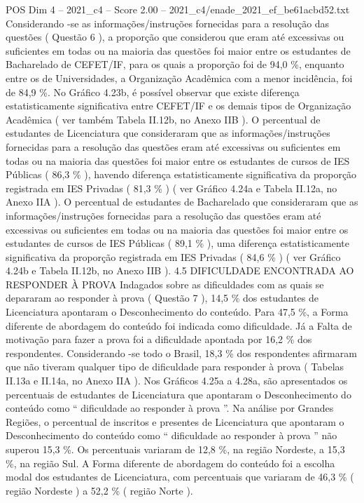 \begin{textsample}{POS Dim 4 – 2021\_c4 – Score 2.00 – 2021\_c4/enade\_2021\_ef\_be61acbd52.txt}
Considerando -se as informações/instruções fornecidas para a resolução das questões ( Questão 6 ), a proporção que considerou que eram até excessivas ou suficientes em todas ou na maioria das questões foi maior entre os estudantes de Bacharelado de CEFET/IF, para os quais a proporção foi de 94,0 \%, enquanto entre os de Universidades, a Organização Acadêmica com a menor incidência, foi de 84,9 \%.
No Gráfico 4.23b, é possível observar que existe diferença estatisticamente significativa entre CEFET/IF e os demais tipos de Organização Acadêmica ( ver também Tabela II.12b, no Anexo IIB ).
O percentual de estudantes de Licenciatura que consideraram que as informações/instruções fornecidas para a resolução das questões eram até excessivas ou suficientes em todas ou na maioria das questões foi maior entre os estudantes de cursos de IES Públicas ( 86,3 \% ), havendo diferença estatisticamente significativa da proporção registrada em IES Privadas ( 81,3 \% ) ( ver Gráfico 4.24a e Tabela II.12a, no Anexo IIA ).
O percentual de estudantes de Bacharelado que consideraram que as informações/instruções fornecidas para a resolução das questões eram até excessivas ou suficientes em todas ou na maioria das questões foi maior entre os estudantes de cursos de IES Públicas ( 89,1 \% ), uma diferença estatisticamente significativa da proporção registrada em IES Privadas ( 84,6 \% ) ( ver Gráfico 4.24b e Tabela II.12b, no Anexo IIB ). 4.5 DIFICULDADE ENCONTRADA AO RESPONDER À PROVA Indagados sobre as dificuldades com as quais se depararam ao responder à prova ( Questão 7 ), 14,5 \% dos estudantes de Licenciatura apontaram o Desconhecimento do conteúdo.
Para 47,5 \%, a Forma diferente de abordagem do conteúdo foi indicada como dificuldade.
Já a Falta de motivação para fazer a prova foi a dificuldade apontada por 16,2 \% dos respondentes.
Considerando -se todo o Brasil, 18,3 \% dos respondentes afirmaram que não tiveram qualquer tipo de dificuldade para responder à prova ( Tabelas II.13a e II.14a, no Anexo IIA ).
Nos Gráficos 4.25a a 4.28a, são apresentados os percentuais de estudantes de Licenciatura que apontaram o Desconhecimento do conteúdo como “ dificuldade ao responder à prova ”.
Na análise por Grandes Regiões, o percentual de inscritos e presentes de Licenciatura que apontaram o Desconhecimento do conteúdo como “ dificuldade ao responder à prova ” não superou 15,3 \%.
Os percentuais variaram de 12,8 \%, na região Nordeste, a 15,3 \%, na região Sul.
A Forma diferente de abordagem do conteúdo foi a escolha modal dos estudantes de Licenciatura, com percentuais que variaram de 46,3 \% ( região Nordeste ) a 52,2 \% ( região Norte ).

\end{textsample}
